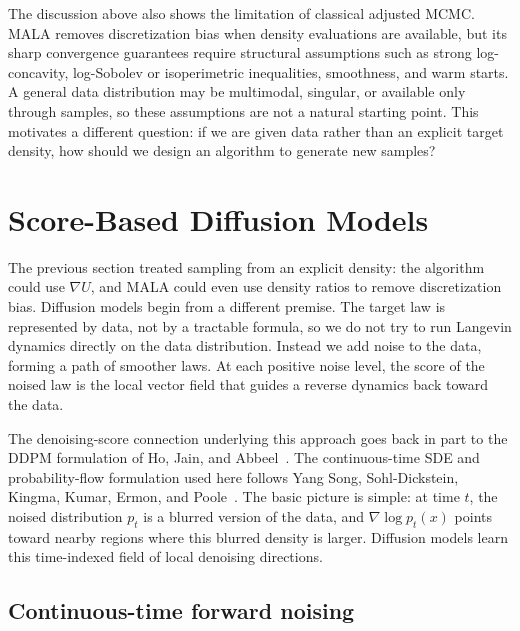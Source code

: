 \documentclass[10pt,a4paper]{amsart}
\numberwithin{equation}{section}
\begin{document}
The discussion above also shows the limitation of classical adjusted MCMC\@.  MALA removes discretization bias when density evaluations are
available, but its sharp convergence guarantees require structural assumptions
such as strong log-concavity, log-Sobolev or isoperimetric inequalities,
smoothness, and warm starts.  A general data distribution may be multimodal,
singular, or available only through samples, so these assumptions are not a
natural starting point.  This motivates a different question: if we are given
data rather than an explicit target density, how should we design an algorithm
to generate new samples?

\section{Score-Based Diffusion Models}

The previous section treated sampling from an explicit density: the algorithm
could use $\nabla U$, and MALA could even use density ratios to remove
discretization bias.  Diffusion models begin from a different premise.  The
target law is represented by data, not by a tractable formula, so we do not try
to run Langevin dynamics directly on the data distribution.  Instead we add
noise to the data, forming a path of smoother laws.  At each positive noise
level, the score of the noised law is the local vector field that guides a
reverse dynamics back toward the data.

The denoising-score connection underlying this approach goes back in part to
the DDPM formulation of Ho, Jain, and Abbeel~\cite{ho2020ddpm}.  The
continuous-time SDE and probability-flow formulation used here follows Yang Song,
Sohl-Dickstein, Kingma, Kumar, Ermon, and Poole~\cite{song2021score}.  The
basic picture is simple: at time $t$, the noised distribution $p_t$ is a
blurred version of the data, and $\nabla\log p_t(x)$ points toward nearby
regions where this blurred density is larger.  Diffusion models learn this
time-indexed field of local denoising directions.

\subsection{Continuous-time forward noising}
\end{document}

